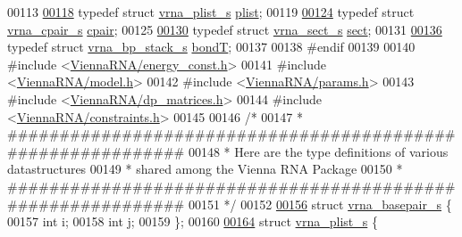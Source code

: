 \begin{DoxyCode}
00113 
\hypertarget{data__structures_8h_source.tex_l00118}{}\hyperlink{group__data__structures_gab1d8894b43aa84cbc50b862a73785fbc}{00118} \textcolor{keyword}{typedef} \textcolor{keyword}{struct }\hyperlink{group__data__structures_structvrna__plist__s}{vrna\_plist\_s}     \hyperlink{group__data__structures_structvrna__plist__s}{plist};
00119 
\hypertarget{data__structures_8h_source.tex_l00124}{}\hyperlink{group__data__structures_ga8412f116a2eb07b59ade9e14ca7c5ef1}{00124} \textcolor{keyword}{typedef} \textcolor{keyword}{struct }\hyperlink{group__data__structures_structvrna__cpair__s}{vrna\_cpair\_s}     \hyperlink{group__data__structures_structvrna__cpair__s}{cpair};
00125 
\hypertarget{data__structures_8h_source.tex_l00130}{}\hyperlink{group__data__structures_gaaacedee1f05d3d45aa6764eca51a8876}{00130} \textcolor{keyword}{typedef} \textcolor{keyword}{struct }\hyperlink{group__data__structures_structvrna__sect__s}{vrna\_sect\_s}      \hyperlink{group__data__structures_structvrna__sect__s}{sect};
00131 
\hypertarget{data__structures_8h_source.tex_l00136}{}\hyperlink{group__data__structures_gaaeed53a7508c6ce549a98223e94b25df}{00136} \textcolor{keyword}{typedef} \textcolor{keyword}{struct }\hyperlink{group__data__structures_structvrna__bp__stack__s}{vrna\_bp\_stack\_s}  \hyperlink{group__data__structures_structvrna__bp__stack__s}{bondT};
00137 
00138 \textcolor{preprocessor}{#endif}
00139 
00140 \textcolor{preprocessor}{#include <\hyperlink{energy__const_8h}{ViennaRNA/energy\_const.h}>}
00141 \textcolor{preprocessor}{#include <\hyperlink{model_8h}{ViennaRNA/model.h}>}
00142 \textcolor{preprocessor}{#include <\hyperlink{params_8h}{ViennaRNA/params.h}>}
00143 \textcolor{preprocessor}{#include <\hyperlink{dp__matrices_8h}{ViennaRNA/dp\_matrices.h}>}
00144 \textcolor{preprocessor}{#include <\hyperlink{constraints_8h}{ViennaRNA/constraints.h}>}
00145 
00146 \textcolor{comment}{/*}
00147 \textcolor{comment}{* ############################################################}
00148 \textcolor{comment}{* Here are the type definitions of various datastructures}
00149 \textcolor{comment}{* shared among the Vienna RNA Package}
00150 \textcolor{comment}{* ############################################################}
00151 \textcolor{comment}{*/}
00152 
\hypertarget{data__structures_8h_source.tex_l00156}{}\hyperlink{group__data__structures}{00156} \textcolor{keyword}{struct }\hyperlink{group__data__structures_structvrna__basepair__s}{vrna\_basepair\_s} \{
00157   \textcolor{keywordtype}{int} i;
00158   \textcolor{keywordtype}{int} j;
00159 \};
00160 
\hypertarget{data__structures_8h_source.tex_l00164}{}\hyperlink{group__data__structures}{00164} \textcolor{keyword}{struct }\hyperlink{group__data__structures_structvrna__plist__s}{vrna\_plist\_s} \{

\end{DoxyCode}
